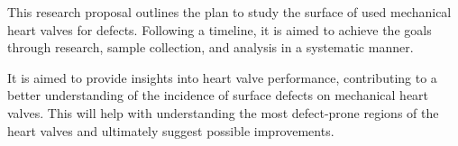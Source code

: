 This research proposal outlines the plan to study the surface of used mechanical heart valves for defects. Following a timeline, it is aimed to achieve the goals through research, sample collection, and analysis in a systematic manner.

It is aimed to provide insights into heart valve performance, contributing to a better understanding of the incidence of surface defects on mechanical heart valves. This will help with understanding the most defect-prone regions of the heart valves and ultimately suggest possible improvements.
